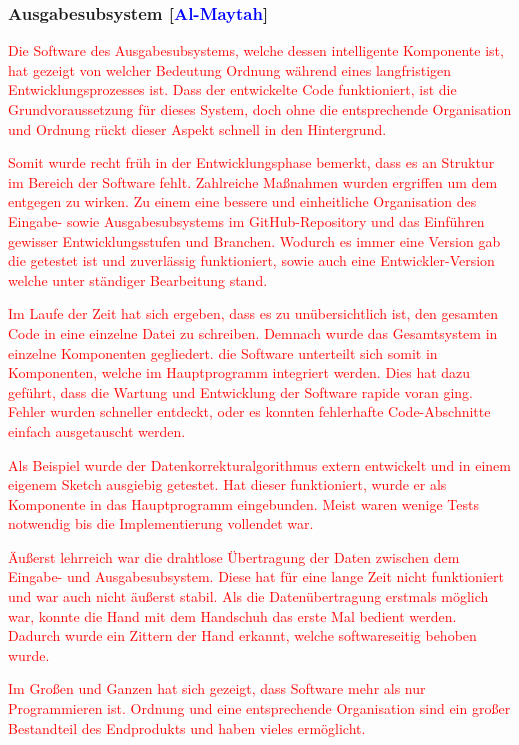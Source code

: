\documentclass[titlepage,12pt,twoside]{article}
\begin{document}
\subsubsection{Ausgabesubsystem [\textcolor{blue}{Al-Maytah}]}
\textcolor{red}{ 

Die Software des Ausgabesubsystems, welche dessen intelligente Komponente ist, 
hat gezeigt von welcher Bedeutung Ordnung während eines langfristigen Entwicklungsprozesses ist. 
Dass der entwickelte Code funktioniert, ist die Grundvoraussetzung für dieses System, 
doch ohne die entsprechende Organisation und Ordnung rückt dieser Aspekt schnell 
in den Hintergrund. 

Somit wurde recht früh in der Entwicklungsphase bemerkt, dass es an Struktur 
im Bereich der Software fehlt. Zahlreiche Maßnahmen wurden ergriffen um dem 
entgegen zu wirken. Zu einem eine bessere und einheitliche Organisation des Eingabe- sowie 
Ausgabesubsystems im GitHub-Repository und das Einführen gewisser Entwicklungsstufen und Branchen. 
Wodurch es immer eine Version gab die getestet ist und zuverlässig funktioniert, sowie auch eine 
Entwickler-Version welche unter ständiger Bearbeitung stand.

Im Laufe der Zeit hat sich ergeben, dass es zu unübersichtlich ist, den gesamten Code in eine einzelne
Datei zu schreiben. Demnach wurde das Gesamtsystem in einzelne Komponenten gegliedert. 
die Software unterteilt sich somit in Komponenten, welche im Hauptprogramm integriert werden.
Dies hat dazu geführt, dass die Wartung und Entwicklung der Software rapide voran ging.
Fehler wurden schneller entdeckt, oder es konnten fehlerhafte Code-Abschnitte einfach ausgetauscht werden.

Als Beispiel wurde der Datenkorrekturalgorithmus extern entwickelt und in einem eigenem Sketch ausgiebig getestet.
Hat dieser funktioniert, wurde er als Komponente in das Hauptprogramm eingebunden.
Meist waren wenige Tests notwendig bis die Implementierung vollendet war.

Äußerst lehrreich war die drahtlose Übertragung der Daten zwischen dem Eingabe- und Ausgabesubsystem.
Diese hat für eine lange Zeit nicht funktioniert und war auch nicht äußerst stabil. 
Als die Datenübertragung erstmals möglich war, konnte die Hand mit dem Handschuh
das erste Mal bedient werden. 
Dadurch wurde ein Zittern der Hand erkannt, welche softwareseitig behoben wurde.

Im Großen und Ganzen hat sich gezeigt, dass Software mehr als nur Programmieren ist. Ordnung 
und eine entsprechende Organisation sind ein großer Bestandteil des Endprodukts und
haben vieles ermöglicht. 

}
\\
\end{document}
